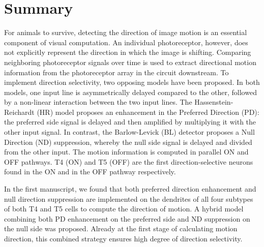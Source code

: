 
\begingroup
\let\clearpage\relax
\let\cleardoublepage\relax
\let\cleardoublepage\relax

\chapter*{Summary}


For animals to survive, detecting the direction of image motion is an essential component of visual computation. An individual photoreceptor, however, does not explicitly represent the direction in which the image is shifting. Comparing neighboring photoreceptor signals over time is used to extract directional motion information from the photoreceptor array in the circuit downstream. To implement direction selectivity, two opposing models have been proposed. In both models, one input line is asymmetrically delayed compared to the other, followed by a non-linear interaction between the two input lines. The Hassenstein-Reichardt (HR) model proposes an enhancement in the Preferred Direction (PD): the preferred side signal is delayed and then amplified by multiplying it with the other input signal. In contrast, the Barlow-Levick (BL) detector proposes a Null Direction (ND) suppression, whereby the null side signal is delayed and divided from the other input. The motion information is computed in parallel ON and OFF pathways. T4 (ON) and T5 (OFF) are the first direction-selective neurons found in the ON and in the OFF pathway respectively.

In the first manuscript, we found that both preferred direction enhancement and null direction suppression are implemented on the dendrites of all four subtypes of both T4 and T5 cells to compute the direction of motion. A hybrid model combining both PD enhancement on the preferred side and ND suppression on the null side was proposed. Already at the first stage of calculating motion direction, this combined strategy ensures high degree of direction selectivity. 


